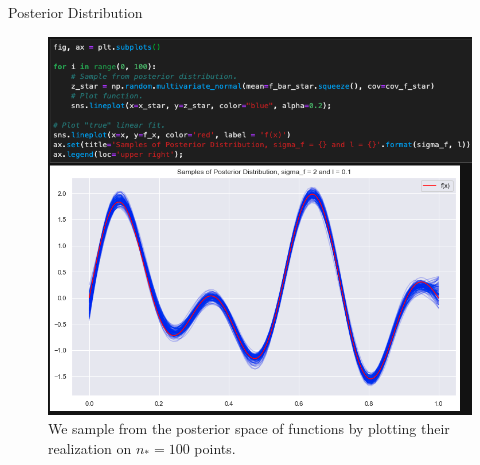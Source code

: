 \documentclass[10pt]{beamer}
\begin{document}
\begin{frame}{Posterior Distribution}
\begin{center}
\begin{figure}
\includegraphics[scale=0.32]{images/code_sample_posterior_example2.png} 
\caption{We sample from the posterior space of functions by plotting their realization on $n_*=100$ points. }
\end{figure}
\end{center}
\end{frame}
\end{document}
